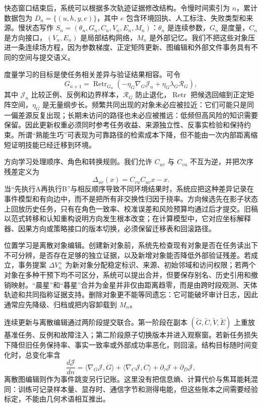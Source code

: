 快态窗口结束后，系统可以根据多次轨迹证据修改结构。令慢时间索引为 $n$，累计数据包为 $D_n=\{(u,h,y,e)\}$，其中 $e$ 包含环境回执、人工标注、失败类型和来源。慢状态写作 $S_n=(\theta_n,G_n,C_n,V_n,E_n,M_n)$：$\theta_n$ 是连续参数，$G_n$ 是度量，$C_n$ 是方向接口，$(V_n,E_n)$ 是局部结构网络，$M_n$ 是外部记忆。我们不把这些对象压进一条连续场方程，因为参数梯度、正定矩阵更新、图编辑和外部文件事务具有不同的空间与提交语义。

度量学习的目标是使任务相关差异与验证结果相容。可令
\[
G_{n+1}=\operatorname{Retr}_{G_n}\!\left(-\eta_G\nabla_G\mathcal{J}_n+\eta_G\lambda_G\mathcal{R}_G\right),
\]
其中 $\mathcal J_n$ 比较正例、反例和边界样本，$\mathcal R_G$ 防止退化，$\operatorname{Retr}$ 把候选回缩到正定矩阵空间，$\eta_G$ 是无量纲步长。频繁共同出现的对象未必应被拉近：它们可能只是同一偏差源反复出现；长期未访问的路径也未必应被推远：低频但高风险的知识需要保留。因此更新权重必须同时参考任务收益、来源独立性、反事实检验和保持约束。所谓“熟能生巧”可表现为可靠路径的检索成本下降，但不能由一次内部距离缩短证明技能已经迁移到环境。

方向学习处理顺序、角色和转换规则。我们允许 $C_{uv}$ 与 $C_{vu}$ 不互为逆，并把次序残差定义为
\[
\Delta_{uv}(x)=C_{vu}C_{uv}x-x.
\]
当“先执行A再执行B”与相反顺序导致不同环境结果时，系统应把这种差异记录在事件模型和有向边中，而不是把所有非交换性归因于挠率。方向候选先在影子状态上回放历史任务，只有在角色一致率、校准误差和风险预算均通过后才提交。旧稿以范式转移和认知重构说明方向发生根本改变；在计算模型中，它对应坐标解释器、因果方向或策略接口的版本切换，必须保留迁移表和回滚路径。

位置学习是离散对象编辑。创建新对象前，系统先检查现有对象是否在任务读出下不可分辨，是否存在足够的独立证据，以及新增对象能否降低外部验证残差。若成立，事务提案 $\Delta V_n^{+}$ 为新对象分配稳定标识、来源、初始邻域和访问权限；若两个对象在多种干预下均不可区分，系统可以提出合并，但要保存别名、历史引用和撤销映射。“晨星”和“暮星”合并为金星并非仅由距离趋零，而是由跨时段观测、天体轨迹和共同指称证据支持。删除对象更不能等同遗忘：它可能破坏审计日志，因此通常应先降级、归档或把内容卸载到 $M_n$。

连续更新与离散编辑通过两阶段提交联合。第一阶段在副本 $(\tilde G,\tilde C,\tilde V,\tilde E)$ 上重放基准任务、反例和故障注入；第二阶段原子切换版本并进入观察窗。若新任务损失下降但旧任务保持率、事实一致率或外部成功率恶化，则回滚。结构目标随时间变化时，总变化率含
\[
\frac{d\mathcal J}{dn}=\langle\nabla_G\mathcal J,\dot G\rangle+\langle\nabla_C\mathcal J,\dot C\rangle+\partial_\tau\mathcal J+\partial_D\mathcal J,
\]
离散图编辑则作为事件跳变另行记账。这里没有把信息熵、计算代价与焦耳能耗混同：训练可记录样本量、显存时、通信字节和测得电能，但这些账本之间需要经验标定，不能由几何术语相互推出。

